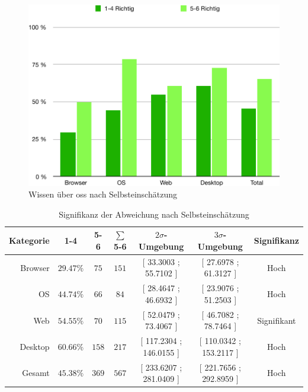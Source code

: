 \documentclass[a4paper]{article}
\begin{document}
                \begin{figure}
                    \includegraphics[width=\textwidth]{assets/results/openSourceJudging/openSourceJudgingDetailedOSSOnlyByKnowledge.pdf}
                    \caption{Wissen über \gls{oss} nach Selbsteinschätzung}
                    \label{figure:knowledge_by_category_self_assessment}
                \end{figure}
                
                \begin{table}
                    \centering
                    \begin{tabular}{rcccccc}
                        Kategorie & 1-4 & 5-6 & $\sum$ 5-6 & $2\sigma$-Umgebung & $3\sigma$-Umgebung & Signifikanz \\\hline\hline
                        Browser & $29.47\%$ & $75$ & $151$ & \tiny{[ 33.3003 ; 55.7102 ]} & \tiny{[ 27.6978 ; 61.3127 ]} & Hoch\\
                        OS & $44.74\%$ & $66$ & $84$ & \tiny{ [ 28.4647 ; 46.6932 ] } &  \tiny{ [ 23.9076 ; 51.2503 ] } & Hoch\\
                        Web & $54.55\%$ & $70$ & $115$ & \tiny{[ 52.0479 ; 73.4067 ]} &  \tiny{ [ 46.7082 ; 78.7464 ] } &  Signifikant\\
                        Desktop & $60.66\%$ & $158$ & $217$ & \tiny{ [ 117.2304 ; 146.0155 ] } & \tiny{ [ 110.0342 ; 153.2117 ] } & Hoch\\\hline
                        Gesamt & $45.38\%$ & $369$ & $567$ & \tiny{[ 233.6207 ; 281.0409 ]} & \tiny{ [ 221.7656 ; 292.8959 ] } & Hoch
                    \end{tabular}
                    \caption{Signifikanz der Abweichung nach Selbsteinschätzung}
                    \label{table:knowledge_by_category_sigma_self_assessment}
                \end{table}
            
\end{document}
